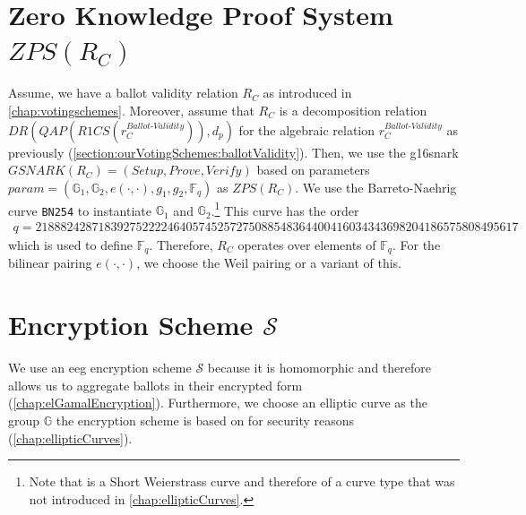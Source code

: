 \section{Zero Knowledge Proof System $ZPS(R_C)$}
\label{section:ourVotingSchemes:zps}

Assume, we have a ballot validity relation $R_C$ as introduced in \cref{chap:votingschemes}.
Moreover, assume that $R_C$ is a decomposition relation $DR(QAP(R1CS(r_C^{Ballot\text{-}Validity})), d_p)$ for the algebraic relation $r_C^{Ballot\text{-}Validity}$ as previously (\cref{section:ourVotingSchemes:ballotValidity}).
Then, we use the \gls{g16snark} $GSNARK(R_C)=(Setup, Prove, Verify)$ based on parameters $param=(\mathbb{G}_1, \mathbb{G}_2, e(\cdot, \cdot), g_1, g_2, \mathbb{F}_q)$ as $ZPS(R_C)$.
We use the Barreto-Naehrig curve \verb|BN254| \cite{jonathan_wang_bn254_2024} to instantiate $\mathbb{G}_1$ and $\mathbb{G}_2$.\footnote{
    \label{footnote:bn254IsSW}
    Note that  is a Short Weierstrass curve and therefore of a curve type that was not introduced in \cref{chap:ellipticCurves}.
}
This curve has the order 
\begin{align*}
    \scriptstyle q = 21888242871839275222246405745257275088548364400416034343698204186575808495617
\end{align*}
which is used to define $\mathbb{F}_q$.
Therefore, $R_C$ operates over elements of $\mathbb{F}_q$.
For the bilinear pairing $e(\cdot, \cdot)$, we choose the Weil pairing or a variant of this. \cite{huber_zk-snarks_2025}

\section{Encryption Scheme $\mathcal{S}$}
\label{section:ourVotingSchemes:encryption}
We use an \gls{eeg} encryption scheme $\mathcal{S}$ because it is homomorphic and therefore allows us to aggregate ballots in their encrypted form (\cref{chap:elGamalEncryption}).
Furthermore, we choose an elliptic curve as the group $\mathbb{G}$ the encryption scheme is based on for security reasons (\cref{chap:ellipticCurves}).


